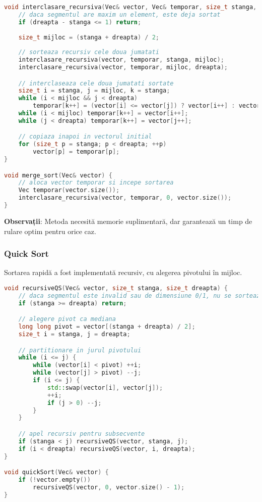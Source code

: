 \documentclass{article}
\begin{document}
\begin{lstlisting}[language=C++, caption={Merge Sort}, label={lst:merge}]
void interclasare_recursiva(Vec& vector, Vec& temporar, size_t stanga, size_t dreapta) {
    // daca segmentul are maxim un element, este deja sortat
    if (dreapta - stanga <= 1) return;
    
    size_t mijloc = (stanga + dreapta) / 2;
    
    // sorteaza recursiv cele doua jumatati
    interclasare_recursiva(vector, temporar, stanga, mijloc);
    interclasare_recursiva(vector, temporar, mijloc, dreapta);

    // interclaseaza cele doua jumatati sortate
    size_t i = stanga, j = mijloc, k = stanga;
    while (i < mijloc && j < dreapta)
        temporar[k++] = (vector[i] <= vector[j]) ? vector[i++] : vector[j++];
    while (i < mijloc) temporar[k++] = vector[i++];
    while (j < dreapta) temporar[k++] = vector[j++];

    // copiaza inapoi in vectorul initial
    for (size_t p = stanga; p < dreapta; ++p)
        vector[p] = temporar[p];
}

void merge_sort(Vec& vector) {
    // aloca vector temporar si incepe sortarea
    Vec temporar(vector.size());
    interclasare_recursiva(vector, temporar, 0, vector.size());
}

\end{lstlisting}

\textbf{Observații}: Metoda necesită memorie suplimentară, dar garantează un timp de rulare optim pentru orice caz.

\newpage

\subsubsection*{Quick Sort}

Sortarea rapidă a fost implementată recursiv, cu alegerea pivotului în mijloc.

\begin{lstlisting}[language=C++, caption={Quick Sort}, label={lst:quick}]
void recursiveQS(Vec& vector, size_t stanga, size_t dreapta) {
    // daca segmentul este invalid sau de dimensiune 0/1, nu se sorteaza
    if (stanga >= dreapta) return;

    // alegere pivot ca mediana
    long long pivot = vector[(stanga + dreapta) / 2];
    size_t i = stanga, j = dreapta;

    // partitionare in jurul pivotului
    while (i <= j) {
        while (vector[i] < pivot) ++i;
        while (vector[j] > pivot) --j;
        if (i <= j) {
            std::swap(vector[i], vector[j]);
            ++i;
            if (j > 0) --j;
        }
    }

    // apel recursiv pentru subsecvente
    if (stanga < j) recursiveQS(vector, stanga, j);
    if (i < dreapta) recursiveQS(vector, i, dreapta);
}

void quickSort(Vec& vector) {
    if (!vector.empty())
        recursiveQS(vector, 0, vector.size() - 1);
}

\end{lstlisting}
\end{document}
